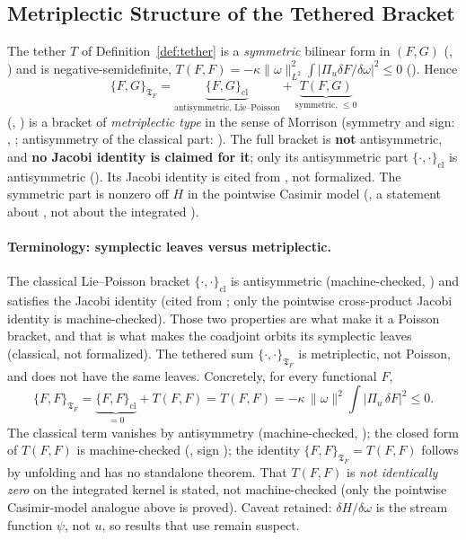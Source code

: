\documentclass[11pt,a4paper]{article}
\theoremstyle{plain}
\theoremstyle{definition}
\theoremstyle{remark}
\newcommand{\Tf}{\mathfrak{T}_F}
\begin{document}
\subsection{Metriplectic Structure of the Tethered Bracket}\label{sec:metriplectic}
The tether $T$ of Definition~\ref{def:tether} is a \emph{symmetric} bilinear form in $(F,G)$ (, ) and is negative-semidefinite, $T(F,F)=-\kappa\|\omega\|_{L^2}^2\int|\Pi_u\delta F/\delta\omega|^2\le0$ (). Hence
\[
\{F,G\}_{\Tf}=\underbrace{\{F,G\}_{\mathrm{cl}}}_{\text{antisymmetric, Lie--Poisson}}+\underbrace{T(F,G)}_{\text{symmetric, }\le0}
\]
(, )
is a bracket of \emph{metriplectic type} in the sense of Morrison \cite{Morrison1986} (symmetry and sign: , ; antisymmetry of the classical part: ). The full bracket is \textbf{not} antisymmetric, and \textbf{no Jacobi identity is claimed for it}; only its antisymmetric part $\{\cdot,\cdot\}_{\mathrm{cl}}$ is antisymmetric (). Its Jacobi identity is cited from \cite{Arnold1966}, not formalized. The symmetric part is nonzero off $H$ in the pointwise Casimir model (, a statement about , not about the integrated ).

\paragraph{Terminology: symplectic leaves versus metriplectic.} The classical Lie--Poisson bracket $\{\cdot,\cdot\}_{\mathrm{cl}}$ is antisymmetric (machine-checked, ) and satisfies the Jacobi identity (cited from \cite{Arnold1966}; only the pointwise cross-product Jacobi identity  is machine-checked). Those two properties are what make it a Poisson bracket, and that is what makes the coadjoint orbits its symplectic leaves (classical, not formalized). The tethered sum $\{\cdot,\cdot\}_{\Tf}$ is metriplectic, not Poisson, and does not have the same leaves. Concretely, for every functional $F$,
\[
\{F,F\}_{\Tf}=\underbrace{\{F,F\}_{\mathrm{cl}}}_{=0}+T(F,F)=T(F,F)=-\kappa\,\|\omega\|^2\!\int|\Pi_u\,\delta F|^2\le 0 .
\]
The classical term vanishes by antisymmetry (machine-checked, ); the closed form of $T(F,F)$ is machine-checked (, sign ); the identity $\{F,F\}_{\Tf}=T(F,F)$ follows by unfolding  and has no standalone theorem. That $T(F,F)$ is \emph{not identically zero} on the integrated kernel is stated, not machine-checked (only the pointwise Casimir-model analogue above is proved). Caveat retained: $\delta H/\delta\omega$ is the stream function $\psi$, not $u$, so results that use  remain suspect.
\end{document}
